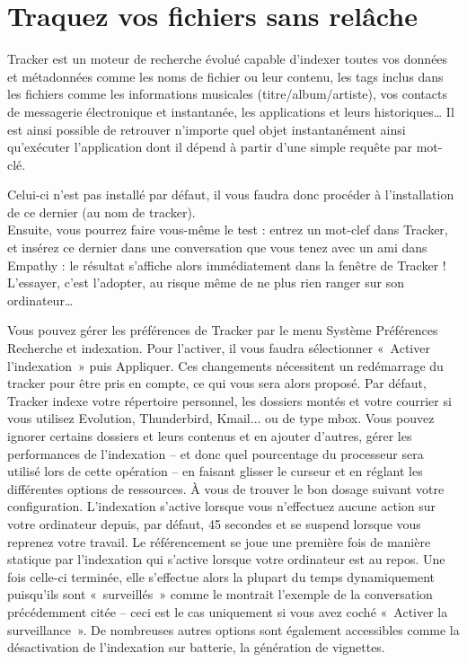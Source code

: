 \section{Traquez vos fichiers sans relâche}
\label{RefTracker}
Tracker est un moteur de recherche évolué capable d'indexer toutes vos données et métadonnées comme les noms de fichier ou leur contenu, les tags inclus dans les fichiers comme les informations musicales (titre/album/artiste), vos contacts de messagerie électronique et instantanée, les applications et leurs historiques\ldots{} Il est ainsi possible de retrouver n'importe quel objet instantanément ainsi qu'exécuter l'application dont il dépend à partir d'une simple requête par mot-clé.\par
Celui-ci n'est pas installé par défaut, il vous faudra donc procéder à l'installation de ce dernier (au nom de tracker).\\
Ensuite, vous pourrez faire vous-même le test : entrez un mot-clef dans Tracker, et insérez ce dernier dans une conversation que vous tenez avec un ami dans Empathy : le résultat s'affiche alors immédiatement dans la fenêtre de Tracker ! L'essayer, c'est l'adopter, au risque même de ne plus rien ranger sur son ordinateur\ldots{}\par
Vous pouvez gérer les préférences de Tracker par le menu Système \FlecheDroite Préférences \FlecheDroite Recherche et indexation. Pour l'activer, il vous faudra sélectionner «~Activer l'indexation~» puis Appliquer. Ces changements nécessitent un redémarrage du  tracker pour être pris en compte, ce qui vous sera alors proposé. Par défaut, Tracker indexe votre répertoire personnel, les dossiers montés et votre courrier si vous utilisez Evolution, Thunderbird, Kmail... ou de type mbox. Vous pouvez ignorer certains dossiers et leurs contenus et en ajouter d'autres, gérer les performances de l'indexation -- et donc quel pourcentage du processeur sera utilisé lors de cette opération -- en faisant glisser le curseur et en réglant les différentes options de ressources. À vous de trouver le bon dosage suivant votre configuration. L'indexation s'active lorsque vous n'effectuez aucune action sur votre ordinateur depuis, par défaut, 45 secondes et se suspend lorsque vous reprenez votre travail. Le référencement se joue une première fois de manière statique par l'indexation qui s'active lorsque votre ordinateur est au repos. Une fois celle-ci terminée, elle s'effectue alors la plupart du temps dynamiquement puisqu'ils sont «~surveillés~» comme le montrait l'exemple de la conversation précédemment citée -- ceci est le cas uniquement si vous avez coché «~Activer la surveillance~». De nombreuses autres options sont également accessibles comme la désactivation de l'indexation sur batterie, la génération de vignettes.\par
